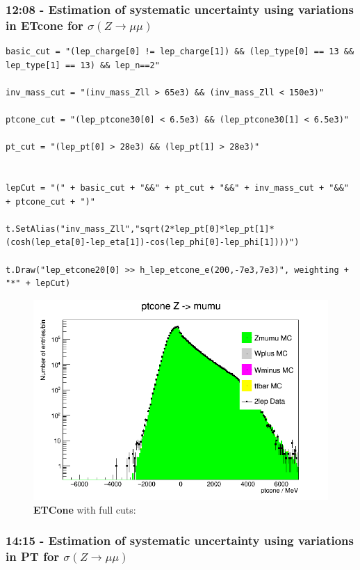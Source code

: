 \subsubsection*{12:08 - Estimation of systematic uncertainty using variations in ETcone for $\sigma (Z \rightarrow \mu\mu)$}
\begin{lstlisting}
basic_cut = "(lep_charge[0] != lep_charge[1]) && (lep_type[0] == 13 && lep_type[1] == 13) && lep_n==2"

inv_mass_cut = "(inv_mass_Zll > 65e3) && (inv_mass_Zll < 150e3)"

ptcone_cut = "(lep_ptcone30[0] < 6.5e3) && (lep_ptcone30[1] < 6.5e3)"

pt_cut = "(lep_pt[0] > 28e3) && (lep_pt[1] > 28e3)"
 
    
lepCut = "(" + basic_cut + "&&" + pt_cut + "&&" + inv_mass_cut + "&&" + ptcone_cut + ")"
    
t.SetAlias("inv_mass_Zll","sqrt(2*lep_pt[0]*lep_pt[1]*(cosh(lep_eta[0]-lep_eta[1])-cos(lep_phi[0]-lep_phi[1])))")
    
t.Draw("lep_etcone20[0] >> h_lep_etcone_e(200,-7e3,7e3)", weighting + "*" + lepCut)
\end{lstlisting}

\begin{figure}[h!]
    \centering
	\includegraphics[width=0.85\linewidth]{plots/05-03-2021/11-30_05-03-21.png}
    \caption{\textbf{ETCone} with full cuts:}
    \label{fig:12-08_05-03-21}
\end{figure}


\subsubsection*{14:15 - Estimation of systematic uncertainty using variations in PT for $\sigma (Z \rightarrow \mu\mu)$}


